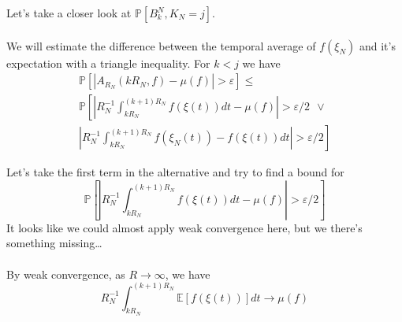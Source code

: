 \documentclass{beamer}
\begin{document}
\begin{frame}

    Let's take a closer look at $\mathbb{P}\left[ B^N_k, K_{N} = j \right]$. 
    \\~\\
    We will estimate the difference between the temporal average of $f(\xi_N)$ and it's expectation with 
    a triangle inequality.
    For $k < j$ we have
    \begin{gather*}
        \mathbb{P}\left[  \left|A_{R_N}(kR_N, f) - \mu(f)\right| > \varepsilon \right] \leq \\
        \mathbb{P}\left[ \left|R_N^{-1}\int_{kR_N}^{(k+1)R_N}f(\xi(t))dt - \mu(f)\right| > \varepsilon/2 \ \ \lor \right.
        \\
        \left.\left|R_N^{-1}\int_{kR_N}^{(k+1)R_N}f(\xi_N(t)) - f(\xi(t))dt \right| > \varepsilon/2 \right]
    \end{gather*}

\end{frame}

\begin{frame}
    Let's take the first term in the alternative and try to find a bound for
    \[
        \mathbb{P}\left[ \left|R_N^{-1}\int_{kR_N}^{(k+1)R_N}f(\xi(t))dt - \mu(f)\right| > \varepsilon/2 \right]
    \]
    It looks like we could almost apply weak convergence here, but we there's something missing\dots \\~\\ 
    By weak convergence, as $R \rightarrow \infty$, we have
    \[
        R_N^{-1}\int_{kR_N}^{(k+1)R_N}\mathbb{E}\left[ f(\xi(t)) \right]dt \rightarrow \mu(f)
    \]
\end{frame}
\end{document}
